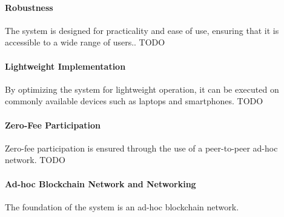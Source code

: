\documentclass{article}
\begin{document}
\paragraph{Robustness}
The system is designed for practicality and ease of use, ensuring that it is accessible to a wide range of users.. TODO

\paragraph{Lightweight Implementation}
By optimizing the system for lightweight operation, it can be executed on commonly available devices such as laptops and smartphones. TODO

\paragraph{Zero-Fee Participation}
Zero-fee participation is ensured through the use of a peer-to-peer ad-hoc network. TODO

\paragraph{Ad-hoc Blockchain Network and Networking}
The foundation of the system is an ad-hoc blockchain network.


\newcommand{\PartySecretKey}[1]{\ensuremath{s_{#1}}}
\newcommand{\Party}[1]{\ensuremath{P_{#1}}}

\newcommand{\EncryptionKey}{\textbf{E}}
\newcommand{\DecryptionKey}{\textbf{d}}

\newcommand{\PartialDecryptionKey}[1]{\ensuremath{d_{#1}}}
\newcommand{\PartialEncryptionKey}[1]{\ensuremath{E_{#1}}}

\newcommand{\EncryptedPartialDecryptionKeyShare}[2]{\ensuremath{C_{#1,#2}}}
\newcommand{\SetOfEncryptedPartialDecryptionKeys}{\ensuremath{\mathbb{C}}}
\newcommand{\SetOfFDKG}{\ensuremath{\mathbb{D}}}
\newcommand{\SetOfSharesOfPartialDecryption}{\ensuremath{\mathbb{C}}}

\newcommand{\IthDecryptionKey}[1]{\ensuremath{d_{#1}}}
\newcommand{\IthEncryptionKey}[1]{E_{#1}}

\newcommand{\DecryptionUsingOf}[2]{\ensuremath{\texttt{Dec}_{#1}(#2)}}
\newcommand{\EncryptionUsingOf}[2]{\ensuremath{\texttt{Enc}_{#1}(#2)}}

\newcommand{\PartialDecryptionKeyShare}[2]{\ensuremath{[d_{#1}]_{#2}}}
\end{document}
